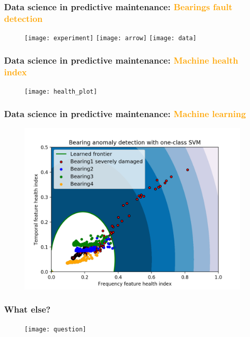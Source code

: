 \documentclass{beamer}
\begin{document}
\begin{frame}
	\frametitle{Data science in predictive maintenance: \textcolor{orange}{Bearings fault detection}}
	\begin{figure}[H]
		\centering
		\texttt{[image: experiment]}
		\texttt{[image: arrow]}
		\texttt{[image: data]}
	\end{figure}
\end{frame}






\begin{frame}
	\frametitle{Data science in predictive maintenance: \textcolor{orange}{Machine health index}}
	\begin{figure}[H]
		\centering
		\texttt{[image: health\_plot]}
	\end{figure}
\end{frame}



\begin{frame}
	\frametitle{Data science in predictive maintenance: \textcolor{orange}{Machine learning}}
	\begin{figure}[H]
		\centering
		\includegraphics[width=0.5\linewidth]{svm}
	\end{figure}
\end{frame}

\begin{frame}
		\frametitle{What else?}
			\begin{figure}[H]
			\centering
			\texttt{[image: question]}
				\end{figure}
		
\end{frame}
\end{document}
